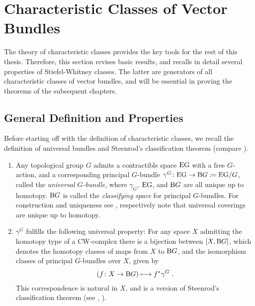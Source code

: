 \section{Characteristic Classes of Vector Bundles}\label{sec:charclsofvb}
The theory of characteristic classes provides the key tools
for the rest of this thesis. Therefore, this section
revises basic results, and recalls in detail several properties
of Stiefel-Whitney classes. The latter are generators of all
characteristic classes of vector bundles, and will be essential in
proving the theorems of the subsequent chapters.

\subsection{General Definition and Properties}
Before starting off with the definition of characteristic classes,
we recall the definition of universal bundles and Steenrod's
classification theorem (compare \cite[Chapter~14.4]{tomdieck}).
\begin{LemDef}\label{def:charcls}
  \begin{enumerate}
  \item Any topological group $G$ admits a contractible space $\mathrm{E}\mathrm{G}$ with a
    free $G$-action, and a corresponding principal $G$-bundle
    $\gamma^G\colon \mathrm{E}\mathrm{G}\to\mathrm{B}G\coloneqq \mathrm{E}\mathrm{G}/G$, called the
    \emph{universal $G$-bundle},
    where $\gamma_G$, $\mathrm{E}\mathrm{G}$, and $\mathrm{B}G$ are all unique up to
    homotopy.
    $\mathrm{B}G$ is called the \emph{classifying space} for principal
    $G$-bundles.
    For construction and uniqueness see \cite[Example~1B.7~ff.]{hatcher},
    respectively note that universal coverings are unique up to homotopy.
  \item\label{item:classificationthm}
    $\gamma^G$ fulfills the following universal property:
    For any space $X$ admitting the homotopy type of a CW-complex
    there is a bijection between $[X,\mathrm{B}G]$, which denotes the homotopy
    classes of maps from $X$ to $\mathrm{B}G$, and the isomorphism classes of
    principal $G$-bundles over $X$, given by
    \begin{gather*}
      \left(f\colon X\to\mathrm{B}G \right) \longmapsto {f}^* \gamma^G
      \;.
    \end{gather*}
    This correspondence is natural in $X$, and is a version of
    Steenrod's classification theorem
    (see 
    \cite[Theorem~14.4.1]{tomdieck},
    \cite[Theorem~1.4, p.~75]{immersionconj}).
  \end{enumerate}
\end{LemDef}

